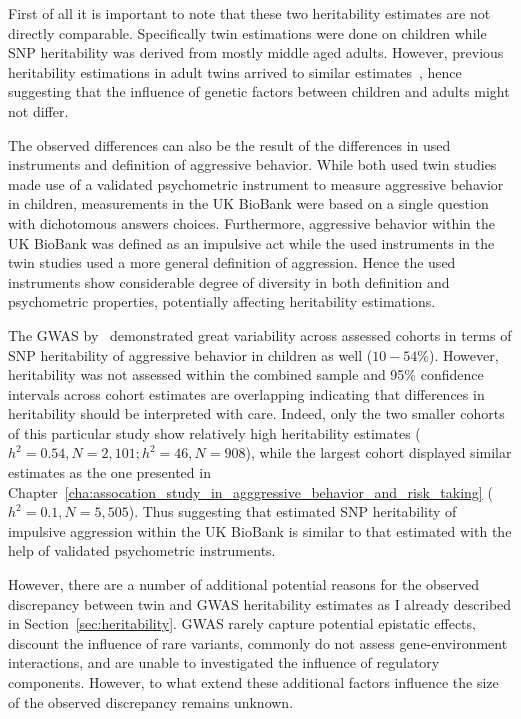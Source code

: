 First of all it is important to note that these two heritability estimates are not directly comparable.
Specifically twin estimations were done on children while SNP heritability was derived from mostly middle aged adults.
However, previous heritability estimations in adult twins arrived to similar estimates~\cite{Miles1997a}, hence suggesting that the influence of genetic factors between children and adults might not differ.

The observed differences can also be the result of the differences in used instruments and definition of aggressive behavior.
While both used twin studies made use of a validated psychometric instrument to measure aggressive behavior in children, measurements in the UK BioBank were based on a single question with dichotomous answers choices.
Furthermore, aggressive behavior within the UK BioBank was defined as an impulsive act while the used instruments in the twin studies used a more general definition of aggression.
Hence the used instruments show considerable degree of diversity in both definition and psychometric properties, potentially affecting heritability estimations.

The GWAS by~\citet{Pappa2016a} demonstrated great variability across assessed cohorts in terms of SNP heritability of aggressive behavior in children as well ($10-54\%$).
However, heritability was not assessed within the combined sample and 95\% confidence intervals across cohort estimates are overlapping indicating that differences in heritability should be interpreted with care.
Indeed, only the two smaller cohorts of this particular study show relatively high heritability estimates ($h^2=0.54, N=2,101; h^2=46, N=908$), while the largest cohort displayed similar estimates as the one presented in Chapter~\ref{cha:assocation_study_in_agggressive_behavior_and_risk_taking} ($h^2=0.1, N=5,505$).
Thus suggesting that estimated SNP heritability of impulsive aggression within the UK BioBank is similar to that estimated with the help of validated psychometric instruments. 

However, there are a number of additional potential reasons for the observed discrepancy between twin and GWAS heritability estimates as I already described in Section~\ref{sec:heritability}.
GWAS rarely capture potential epistatic effects, discount the influence of rare variants, commonly do not assess gene-environment interactions, and are unable to investigated the influence of regulatory components. 
However, to what extend these additional factors influence the size of the observed discrepancy remains unknown.

